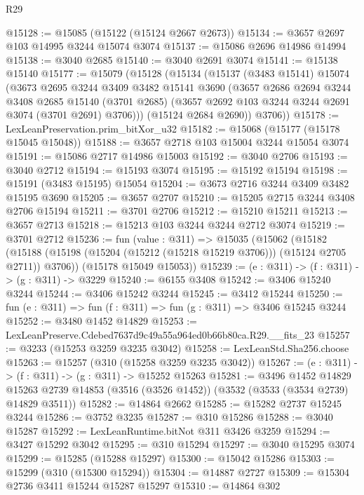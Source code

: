\begin{lexlean}{R29}
\begin{coremodule}
@15128 := @15085 (@15122 (@15124 @2667 @2673))
@15134 := @3657 @2697 @103 @14995 @3244 @15074 @3074
@15137 := @15086 @2696 @14986 @14994
@15138 := @3040 @2685
@15140 := @3040 @2691 @3074
@15141 := @15138 @15140
@15177 := @15079
    (@15128
      (@15134
        (@15137
          (@3483 @15141)
          @15074
          (@3673
            @2695
            @3244
            @3409
            @3482
            @15141
            @3690
            (@3657
              @2686
              @2694
              @3244
              @3408
              @2685
              @15140
              (@3701 @2685)
              (@3657 @2692 @103 @3244 @3244 @2691 @3074 (@3701 @2691) @3706)))
          (@15124 @2684 @2690))
        @3706))
@15178 := LexLeanPreservation.prim_bitXor_u32
@15182 := @15068 (@15177 (@15178 @15045 @15048))
@15188 := @3657 @2718 @103 @15004 @3244 @15054 @3074
@15191 := @15086 @2717 @14986 @15003
@15192 := @3040 @2706
@15193 := @3040 @2712
@15194 := @15193 @3074
@15195 := @15192 @15194
@15198 := @15191 (@3483 @15195) @15054
@15204 := @3673 @2716 @3244 @3409 @3482 @15195 @3690
@15205 := @3657 @2707
@15210 := @15205 @2715 @3244 @3408 @2706 @15194
@15211 := @3701 @2706
@15212 := @15210 @15211
@15213 := @3657 @2713
@15218 := @15213 @103 @3244 @3244 @2712 @3074
@15219 := @3701 @2712
@15236 := fun (value : @311) =>
  @15035
    (@15062
      (@15182 (@15188 (@15198 (@15204 (@15212 (@15218 @15219 @3706))) (@15124 @2705 @2711)) @3706))
      (@15178 @15049 @15053))
@15239 := (e : @311) -> (f : @311) -> (g : @311) -> @3229
@15240 := @6155 @3408
@15242 := @3406 @15240 @3244
@15244 := @3406 @15242 @3244
@15245 := @3412 @15244
@15250 := fun (e : @311) => fun (f : @311) => fun (g : @311) => @3406 @15245 @3244
@15252 := @3480 @1452 @14829
@15253 := LexLeanPreserve.Cdebed7637d9c49a55a964ed0b66b80ca.R29.__fits_23
@15257 := @3233 (@15253 @3259 @3235 @3042)
@15258 := LexLeanStd.Sha256.choose
@15263 := @15257 (@310 (@15258 @3259 @3235 @3042))
@15267 := (e : @311) -> (f : @311) -> (g : @311) -> @15252 @15263
@15281 := @3496
    @1452
    @14829
    @15263
    @2739
    @14853
    (@3516 (@3526 @1452))
    (@3532 (@3533 (@3534 @2739) @14829 @3511))
@15282 := @14864 @2662
@15285 := @15282 @2737 @15245 @3244
@15286 := @3752 @3235
@15287 := @310 @15286
@15288 := @3040 @15287
@15292 := LexLeanRuntime.bitNot @311 @3426 @3259
@15294 := @3427 @15292 @3042
@15295 := @310 @15294
@15297 := @3040 @15295 @3074
@15299 := @15285 (@15288 @15297)
@15300 := @15042 @15286
@15303 := @15299 (@310 (@15300 @15294))
@15304 := @14887 @2727
@15309 := @15304 @2736 @3411 @15244 @15287 @15297
@15310 := @14864 @302

\end{coremodule}
\end{lexlean}
